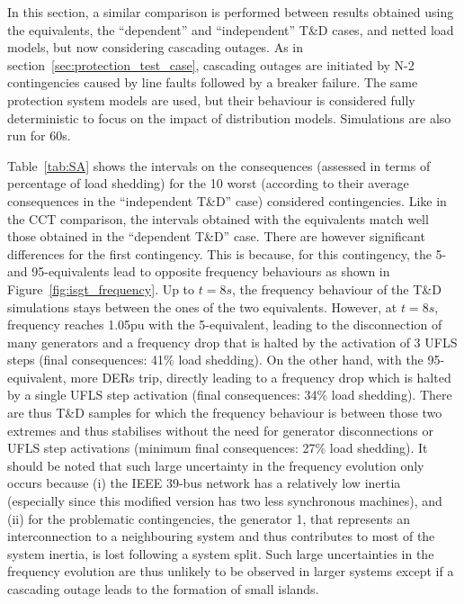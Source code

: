 In this section, a similar comparison is performed between results obtained using the equivalents, the ``dependent'' and ``independent'' T\&D cases, and netted load models, but now considering cascading outages. As in section~\ref{sec:protection_test_case}, cascading outages are initiated by N-2 contingencies caused by line faults followed by a breaker failure. The same protection system models are used, but their behaviour is considered fully deterministic to focus on the impact of distribution models. Simulations are also run for 60s.

Table~\ref{tab:SA} shows the intervals on the consequences (assessed in terms of percentage of load shedding) for the 10 worst (according to their average consequences in the ``independent T\&D'' case) considered contingencies. Like in the CCT comparison, the intervals obtained with the equivalents match well those obtained in the ``dependent T\&D'' case. There are however significant differences for the first contingency. This is because, for this contingency, the 5- and 95-equivalents lead to opposite frequency behaviours as shown in Figure~\ref{fig:isgt_frequency}. Up to \(t=8s\), the frequency behaviour of the T\&D simulations stays between the ones of the two equivalents. However, at \(t=8s\), frequency reaches 1.05pu with the 5-equivalent, leading to the disconnection of many generators and a frequency drop that is halted by the activation of 3 UFLS steps (final consequences: 41\% load shedding). On the other hand, with the 95-equivalent, more DERs trip, directly leading to a frequency drop which is halted by a single UFLS step activation (final consequences: 34\% load shedding). There are thus  T\&D samples for which the frequency behaviour is between those two extremes and thus stabilises without the need for generator disconnections or UFLS step activations (minimum final consequences: 27\% load shedding). It should be noted that such large uncertainty in the frequency evolution only occurs because (i) the IEEE 39-bus network has a relatively low inertia (especially since this modified version has two less synchronous machines), and (ii) for the problematic contingencies, the generator 1, that represents an interconnection to a neighbouring system and thus contributes to most of the system inertia, is lost following a system split. Such large uncertainties in the frequency evolution are thus unlikely to be observed in larger systems except if a cascading outage leads to the formation of small islands.


